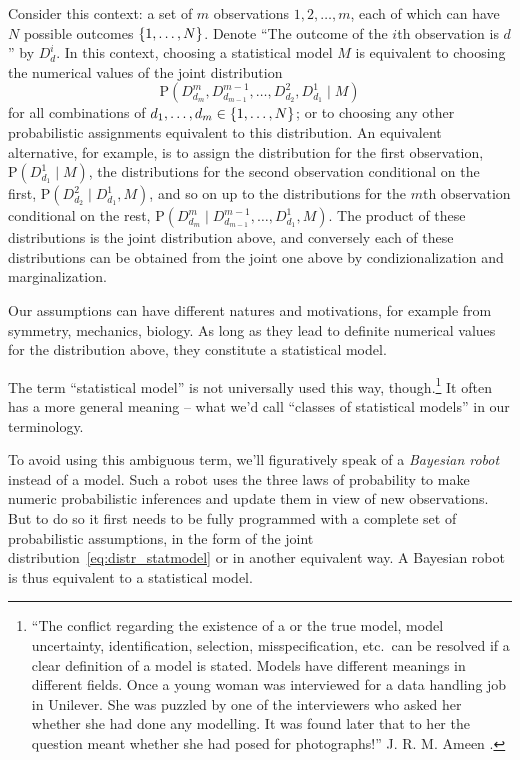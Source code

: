 \documentclass[\ifafour a4paper,12pt,\else a5paper,10pt,\fi%
onecolumn,oneside,article,%
british%
]{memoir}
\theoremstyle{remark}
\theoremstyle{innote}
\newcommand*{\citep}{\parencites}
\DeclarePairedDelimiter\set{\{}{\}}
\newcommand*{\p}{\mathrm{P}}%
\renewcommand*{\|}{\mathpunct{|}}
\begin{document}
Consider this context: a set of $m$ observations $1,2,\dotsc,m$, each of
which can have $N$ possible outcomes $\set{1,\dotsc,N}$. Denote \enquote{The
  outcome of the $i$th observation is $d$} by $D^i_d$. In this context,
choosing a statistical model $M$ is equivalent to choosing the numerical
values of the joint distribution
\begin{equation}
  \label{eq:distr_statmodel}
  \p( D^m_{d_m}, D^{m-1}_{d_{m-1}}, \dotsc,  D^2_{d_2}, D^1_{d_1} \|  M)
\end{equation}
for all combinations of $d_1,\dotsc,d_m \in \set{1,\dotsc,N}$; or to
choosing any other probabilistic assignments equivalent to this
distribution. An equivalent alternative, for example, is to assign the
distribution for the first observation, $\p(D^1_{d_1} \|M)$, the
distributions for the second observation conditional on the first,
$\p(D^2_{d_2} \|D^1_{d_1}, M)$, and so on up to the distributions for the
$m$th observation conditional on the rest,
$\p(D^m_{d_m} \| D^{m-1}_{d_{m-1}},\dotsc,D^1_{d_1},M)$. The product of
these distributions is the joint distribution above, and conversely each of
these distributions can be obtained from the joint one above by
condizionalization and marginalization.

Our assumptions can have different natures and motivations, for example
from symmetry, mechanics, biology. As long as they lead to definite
numerical values for the distribution above, they constitute a statistical
model.

The term \enquote{statistical model} is not universally used this way,
though.\footnote{\enquote{The conflict regarding the existence of a or the
    true model, model uncertainty, identification, selection,
    misspecification, etc.\ can be resolved if a clear definition of a
    model is stated. Models have different meanings in different fields.
    Once a young woman was interviewed for a data handling job in Unilever.
    She was puzzled by one of the interviewers who asked her whether she
    had done any modelling. It was found later that to her the question
    meant whether she had posed for photographs!} J. R. M. Ameen
  \citep[p.~453]{copasetal1995}.} It often has a more general meaning --
what we'd call \enquote{classes of statistical models} in our terminology.

To avoid using this ambiguous term, we'll figuratively speak of a
\emph{Bayesian robot} instead of a model. Such a robot uses the three laws
of probability to make numeric probabilistic inferences and update them in
view of new observations. But to do so it first needs to be fully
programmed with a complete set of probabilistic assumptions, in the form of
the joint distribution~\eqref{eq:distr_statmodel} or in another equivalent
way. A Bayesian robot is thus equivalent to a statistical model.
\end{document}
